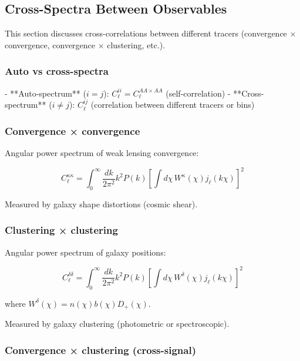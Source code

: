 \subsection{Cross-Spectra Between Observables}\label{subsec:obs_cross_spectra}

This section discusses cross-correlations between different tracers (convergence × convergence, convergence × clustering, etc.).

\subsubsection{Auto vs cross-spectra}

- **Auto-spectrum** ($i = j$): $C_\ell^{ii} = C_\ell^{AA \times AA}$ (self-correlation)
- **Cross-spectrum** ($i \neq j$): $C_\ell^{ij}$ (correlation between different tracers or bins)

\subsubsection{Convergence × convergence}

Angular power spectrum of weak lensing convergence:

\begin{equation}
C_\ell^{\kappa\kappa} = \int_0^\infty \frac{dk}{2\pi^2} k^2 P(k) \left[\int d\chi \, W^\kappa(\chi) j_\ell(k\chi)\right]^2
\end{equation}

Measured by galaxy shape distortions (cosmic shear).

\subsubsection{Clustering × clustering}

Angular power spectrum of galaxy positions:

\begin{equation}
C_\ell^{\delta\delta} = \int_0^\infty \frac{dk}{2\pi^2} k^2 P(k) \left[\int d\chi \, W^\delta(\chi) j_\ell(k\chi)\right]^2
\end{equation}

where $W^\delta(\chi) = n(\chi) b(\chi) D_+(\chi)$.

Measured by galaxy clustering (photometric or spectroscopic).

\subsubsection{Convergence × clustering (cross-signal)}

